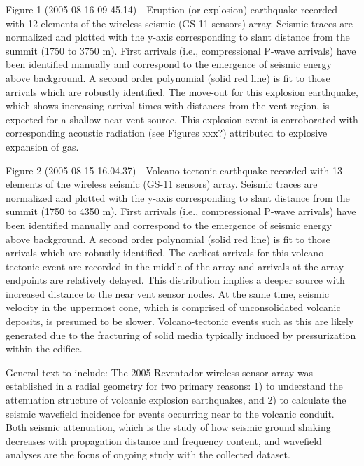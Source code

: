 
Figure 1 (2005-08-16 09 45.14) - Eruption (or explosion) earthquake recorded
with 12 elements of the wireless seismic (GS-11 sensors) array.  Seismic
traces are normalized and plotted with the y-axis corresponding to slant
distance from the summit (1750 to 3750 m).  First arrivals (i.e.,
compressional P-wave arrivals) have been identified manually and correspond
to the emergence of seismic energy above background.  A second order
polynomial (solid red line) is fit to those arrivals which are robustly
identified.  The move-out for this explosion earthquake, which shows
increasing arrival times with distances from the vent region, is expected for
a shallow near-vent source.  This explosion event is corroborated with
corresponding acoustic radiation (see Figures xxx?) attributed to explosive
expansion of gas.

Figure 2 (2005-08-15 16.04.37) - Volcano-tectonic earthquake recorded with 13
elements of the wireless seismic (GS-11 sensors) array.  Seismic traces are
normalized and plotted with the y-axis corresponding to slant distance from
the summit (1750 to 4350 m).  First arrivals (i.e., compressional P-wave
arrivals) have been identified manually and correspond to the emergence of
seismic energy above background.  A second order polynomial (solid red line)
is fit to those arrivals which are robustly identified.  The earliest
arrivals for this volcano-tectonic event are recorded in the middle of the
array and arrivals at the array endpoints are relatively delayed.  This
distribution implies a deeper source with increased distance to the near vent
sensor nodes.  At the same time, seismic velocity in the uppermost cone,
which is comprised of unconsolidated volcanic deposits, is presumed to be
slower.  Volcano-tectonic events such as this are likely generated due to the
fracturing of solid media typically induced by pressurization within the
edifice.

General text to include:
The 2005 Reventador wireless sensor array was established in a radial
geometry for two primary reasons: 1) to understand the attenuation
structure of volcanic explosion earthquakes, and 2) to calculate the
seismic wavefield incidence for events occurring near to the volcanic
conduit.  Both seismic attenuation, which is the study of how seismic
ground shaking decreases with propagation distance and frequency
content, and wavefield analyses are the focus of ongoing study with
the collected dataset.  

